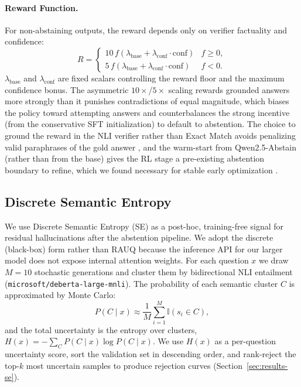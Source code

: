 \documentclass[11pt]{article}
\begin{document}
\paragraph{Reward Function.}
For non-abstaining outputs, the reward depends only on verifier factuality and confidence:
\[
R =
\begin{cases}
10\, f (\lambda_{\text{base}} + \lambda_{\text{conf}}\cdot\text{conf}) & f \ge 0, \\
5\, f (\lambda_{\text{base}} + \lambda_{\text{conf}}\cdot\text{conf})  & f < 0.
\end{cases}
\]
$\lambda_{\text{base}}$ and $\lambda_{\text{conf}}$ are fixed scalars controlling the reward floor and the maximum confidence bonus. The asymmetric $10\times$/$5\times$ scaling rewards grounded answers more strongly than it punishes contradictions of equal magnitude, which biases the policy toward attempting answers and counterbalances the strong incentive (from the conservative SFT initialization) to default to abstention. The choice to ground the reward in the NLI verifier rather than Exact Match avoids penalizing valid paraphrases of the gold answer \cite{ji2023survey}, and the warm-start from Qwen2.5-Abstain (rather than from the base) gives the RL stage a pre-existing abstention boundary to refine, which we found necessary for stable early optimization \cite{ho2023largelanguagemodelsreasoning}.

\subsection{Discrete Semantic Entropy}\label{sec:se-method}

We use Discrete Semantic Entropy (SE) \cite{Farquhar2024Detecting} as a post-hoc, training-free signal for residual hallucinations after the abstention pipeline. We adopt the discrete (black-box) form rather than RAUQ \cite{vazhentsev2025rauq} because the inference API for our larger model does not expose internal attention weights. For each question $x$ we draw $M=10$ stochastic generations and cluster them by bidirectional NLI entailment (\texttt{microsoft/deberta-large-mnli}). The probability of each semantic cluster $C$ is approximated by Monte Carlo:
\begin{equation}
P(C \mid x) \approx \frac{1}{M} \sum_{i=1}^M \mathbb{I}(s_i \in C),
\end{equation}
and the total uncertainty is the entropy over clusters,
$H(x) = -\sum_{C} P(C \mid x) \log P(C \mid x).$
We use $H(x)$ as a per-question uncertainty score, sort the validation set in descending order, and rank-reject the top-$k$ most uncertain samples to produce rejection curves (Section~\ref{sec:results-se}).
\end{document}
